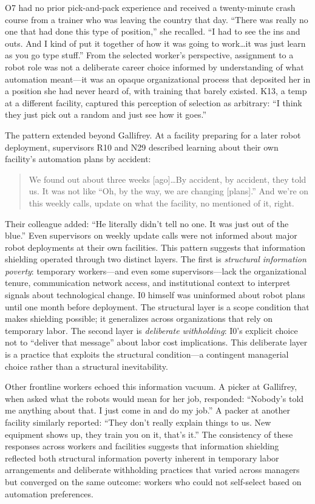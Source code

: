 \documentclass[12pt]{article}
\begin{document}
O7 had no prior pick-and-pack experience and received a twenty-minute crash course from a trainer who was leaving the country that day. ``There was really no one that had done this type of position,'' she recalled. ``I had to see the ins and outs. And I kind of put it together of how it was going to work\ldots it was just learn as you go type stuff.'' From the selected worker's perspective, assignment to a robot role was not a deliberate career choice informed by understanding of what automation meant---it was an opaque organizational process that deposited her in a position she had never heard of, with training that barely existed. K13, a temp at a different facility, captured this perception of selection as arbitrary: ``I think they just pick out a random and just see how it goes.''

The pattern extended beyond Gallifrey. At a facility preparing for a later robot deployment, supervisors R10 and N29 described learning about their own facility's automation plans by accident:

\begin{quote}
We found out about three weeks [ago]\ldots By accident, by accident, they told us. It was not like ``Oh, by the way, we are changing [plans].'' And we're on this weekly calls, update on what the facility, no mentioned of it, right.
\end{quote}

Their colleague added: ``He literally didn't tell no one. It was just out of the blue.'' Even supervisors on weekly update calls were not informed about major robot deployments at their own facilities. This pattern suggests that information shielding operated through two distinct layers. The first is \textit{structural information poverty}: temporary workers---and even some supervisors---lack the organizational tenure, communication network access, and institutional context to interpret signals about technological change. I0 himself was uninformed about robot plans until one month before deployment. The structural layer is a scope condition that makes shielding possible; it generalizes across organizations that rely on temporary labor. The second layer is \textit{deliberate withholding}: I0's explicit choice not to ``deliver that message'' about labor cost implications. This deliberate layer is a practice that exploits the structural condition---a contingent managerial choice rather than a structural inevitability.

Other frontline workers echoed this information vacuum. A picker at Gallifrey, when asked what the robots would mean for her job, responded: ``Nobody's told me anything about that. I just come in and do my job.'' A packer at another facility similarly reported: ``They don't really explain things to us. New equipment shows up, they train you on it, that's it.'' The consistency of these responses across workers and facilities suggests that information shielding reflected both structural information poverty inherent in temporary labor arrangements and deliberate withholding practices that varied across managers but converged on the same outcome: workers who could not self-select based on automation preferences.
\end{document}
